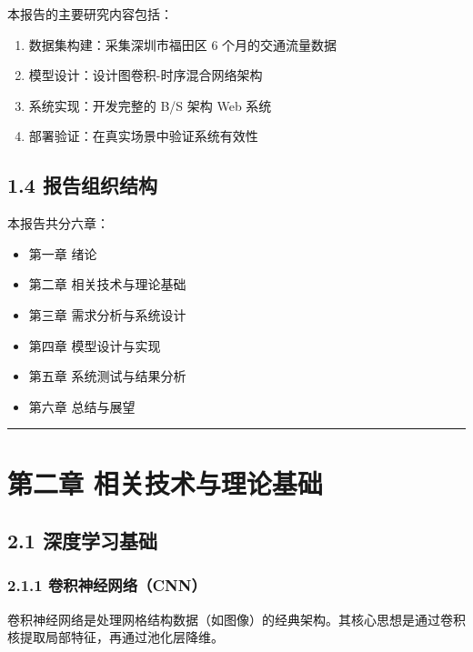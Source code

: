 \documentclass{harryopo-report}
\begin{document}
本报告的主要研究内容包括：

\begin{enumerate}
  \item {\fzht 数据集构建}：采集深圳市福田区 6 个月的交通流量数据
  \item {\fzht 模型设计}：设计图卷积-时序混合网络架构
  \item {\fzht 系统实现}：开发完整的 B/S 架构 Web 系统
  \item {\fzht 部署验证}：在真实场景中验证系统有效性
\end{enumerate}

\section*{1.4 报告组织结构}

本报告共分六章：

\begin{itemize}
  \item {\fzht 第一章} 绪论
  \item {\fzht 第二章} 相关技术与理论基础
  \item {\fzht 第三章} 需求分析与系统设计
  \item {\fzht 第四章} 模型设计与实现
  \item {\fzht 第五章} 系统测试与结果分析
  \item {\fzht 第六章} 总结与展望
\end{itemize}

\medskip\hrule\medskip

\chapter*{第二章 相关技术与理论基础}

\section*{2.1 深度学习基础}

\subsection*{2.1.1 卷积神经网络（CNN）}

卷积神经网络是处理网格结构数据（如图像）的经典架构。其核心思想是通过卷积核提取局部特征，再通过池化层降维。
\end{document}
